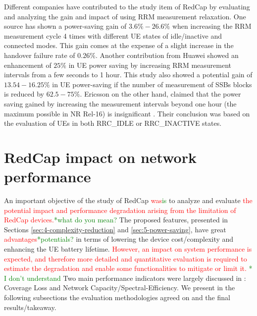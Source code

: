 \documentclass[]{IEEEtran}
\newcommand{\CAREPL}[2]{\textcolor{red}{#1}\textcolor{green}{#2}}
\begin{document}
Different companies have contributed to the study item of RedCap \cite{3gpp_study_2021_38.875} by evaluating and analyzing the gain and impact of using RRM measurement relaxation. One source \cite{3gpp_tp_2021_R2-2100459} has shown a power-saving gain of $3.6\% - 26.6\%$ when increasing the RRM measurement cycle 4 times with different UE states of idle/inactive and connected modes. This gain comes at the expense of a slight increase in the handover failure rate of $0.26\%$.
Another contribution from Huawei \cite{3gpp_further_2020_R2-2009116} showed an enhancement of $25\%$ in UE power saving by increasing RRM measurement intervals from a few seconds to 1 hour. This study also showed a potential gain of $13.54-16.25\%$ in UE power-saving if the number of measurement of SSBs blocks is reduced by $62.5-75\%$.
Ericsson on the other hand, claimed that the power saving gained by increasing the measurement intervals beyond one hour (the maximum possible in NR Rel-16) is insignificant \cite{3gpp_redcap_2020_R2-2009620}. Their conclusion was based on the evaluation of UEs in both RRC\_IDLE or RRC\_INACTIVE states.

%   

\section{RedCap impact on network performance}
\label{sec:6-redcap-impact}


An important objective of the study of RedCap \CAREPL{was}{is} to analyze and evaluate \CAREPL{the potential impact and performance degradation arising from the limitation of RedCap devices.}{*what do you mean?} 
The proposed features, presented in Sections \ref{sec:4-complexity-reduction} and \ref{sec:5-power-saving}, have great \CAREPL{advantages}{*potentials?} in terms of lowering the device cost/complexity and enhancing the UE battery lifetime. 
\CAREPL{However, an impact on system performance is expected, and therefore more detailed and quantitative evaluation is required to estimate the degradation and enable some functionalities to mitigate or limit it. }{* I don't understand}
Two main performance indicators were largely discussed in \cite{3gpp_study_2021_38.875}: Coverage Loss and Network Capacity/Spectral-Efficiency. We present in the following subsections the evaluation methodologies agreed on and the final results/takeaway.  
\end{document}
